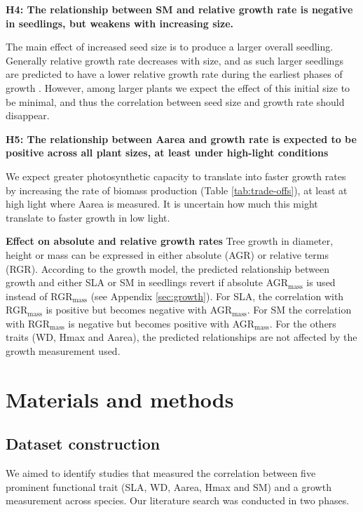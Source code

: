 \documentclass[a4paper,11pt]{article}
\begin{document}
\textbf{H4: The relationship between SM and relative growth rate is negative in seedlings, but weakens with increasing size.}

The main effect of increased seed size is to produce a larger overall seedling. Generally relative growth rate decreases with size, and as such larger seedlings are predicted to have a lower relative growth rate during the earliest phases of growth \citep{Turnbull:2012ew}. However, among larger plants we expect the effect of this initial size to be minimal, and thus the correlation between seed size and growth rate should disappear.

\textbf{H5: The relationship between Aarea and growth rate is expected to be positive across all plant sizes, at least under high-light conditions}

We expect greater photosynthetic capacity to translate into faster growth rates by increasing the rate of biomass production (Table \ref{tab:trade-offs}), at least at high light where Aarea is measured. It is uncertain how much this might translate to faster growth in low light.

\textbf{Effect on absolute and relative growth rates}
Tree growth in diameter, height or mass can be expressed in either absolute (AGR) or relative terms (RGR). According to the growth model, the predicted relationship between growth and either SLA or SM in seedlings revert if absolute AGR$_\textrm{mass}$ is used instead of RGR$_\textrm{mass}$ (see Appendix \ref{sec:growth}). For SLA, the correlation with RGR$_\textrm{mass}$ is positive but becomes negative with AGR$_\textrm{mass}$. For SM the correlation with RGR$_\textrm{mass}$ is negative but becomes positive with AGR$_\textrm{mass}$. For the others traits (WD, Hmax and Aarea), the predicted relationships are not affected by the growth measurement used.


\section*{Materials and methods}\label{material-and-methods}

\subsection*{Dataset construction}\label{data-construction}

We aimed to identify studies that measured the correlation between five prominent functional trait (SLA, WD, Aarea, Hmax and SM) and a growth measurement across species. Our literature search was conducted in two phases.
\end{document}
